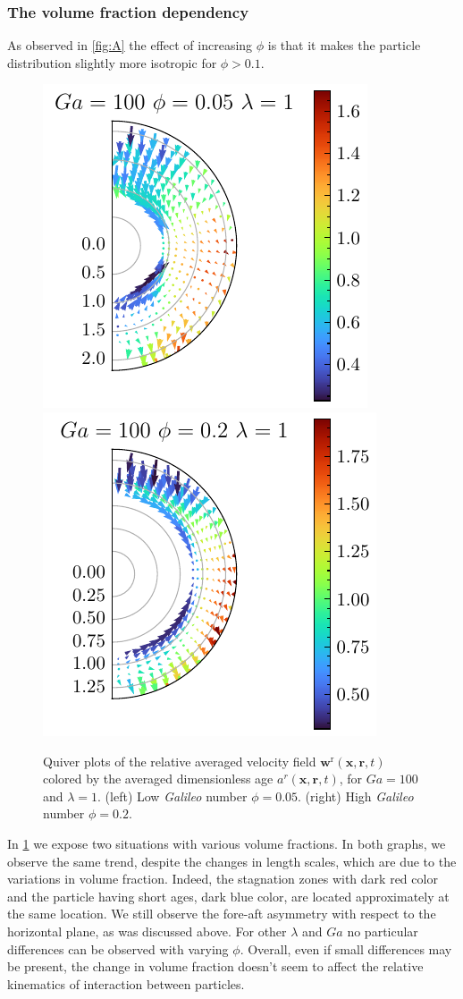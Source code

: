 \subsubsection{The volume fraction dependency}
As observed in \ref{fig:A} the effect of increasing $\phi$ is that it makes the particle distribution slightly more isotropic for $\phi >0.1$. 
\begin{figure}[h!]
    \centering
    \includegraphics[height=0.35\textwidth]{image/HOMOGENEOUS_NEW/Dist/U_rel_l_1_Ga_100_PHI_5.pdf}
    \includegraphics[height=0.35\textwidth]{image/HOMOGENEOUS_NEW/Dist/U_rel_l_1_Ga_100_PHI_20.pdf}
    \caption{Quiver plots of the relative averaged velocity field $\textbf{w}^\text{r}(\textbf{x},\textbf{r},t)$ colored by the averaged dimensionless age $a^r(\textbf{x},\textbf{r},t)$, for $Ga = 100$ and $\lambda = 1$. 
    (left) Low \textit{Galileo} number $\phi = 0.05$.
    (right) High \textit{Galileo} number $\phi = 0.2$. }
    \label{fig:Why_Phi_matter}
\end{figure}
In \ref{fig:Why_Phi_matter} we expose two situations with various volume fractions. 
In both graphs, we observe the same trend, despite the changes in length scales, which are due to the variations in volume fraction. 
Indeed, the stagnation zones with dark red color and the particle having short ages, dark blue color, are located approximately at the same location. 
We still observe the fore-aft asymmetry with respect to the horizontal plane, as was discussed above. 
For other $\lambda$ and $Ga$ no particular differences can be observed with varying $\phi$. 
Overall, even if small differences may be present, the change in volume fraction doesn't seem to affect the relative kinematics   of interaction between particles. 

